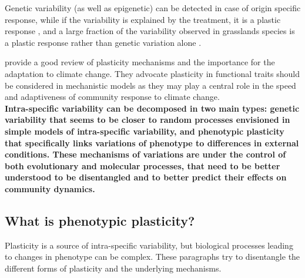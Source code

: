 Genetic variability (as well as epigenetic) can be detected in case of origin specific response, while if the variability is explained by the treatment, it is a plastic response \parencite{frei_plastic_2014}, and a large fraction of the variability observed in grasslands species is a plastic response rather than genetic variation alone \parencite{frei_plastic_2014, merila_climate_2014}.

\citet{nicotra_plant_2010} provide a good review of plasticity mechanisms and the importance for the adaptation to climate change. They advocate plasticity in functional traits should be considered in mechanistic models as they may play a central role in the speed and adaptiveness of community response to climate change.\\

\textbf{Intra-specific variability can be decomposed in two main types: genetic variability that seems to be closer to random processes envisioned in simple models of intra-specific variability, and phenotypic plasticity that specifically links variations of phenotype to differences in external conditions. These mechanisms of variations are under the control of both evolutionary and molecular processes, that need to be better understood to be disentangled and to better predict their effects on community dynamics.}

\subsection{What is phenotypic plasticity?}

Plasticity is a source of intra-specific variability, but biological processes leading to changes in phenotype can be complex. These paragraphs try to disentangle the different forms of plasticity and the underlying mechanisms.

